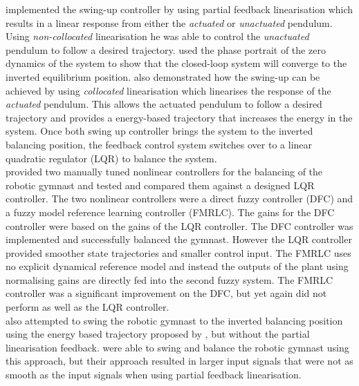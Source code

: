 \citet{spong_swingup} implemented the swing-up controller by using partial feedback linearisation which results in a linear response from either the \textit{actuated} or \textit{unactuated} pendulum. Using \textit{non-collocated} linearisation he was able to control the \textit{unactuated} pendulum to follow a desired trajectory. \citeauthor{spong_swingup} used the phase portrait of the zero dynamics of the system to show that the closed-loop system will converge to the inverted equilibrium position. \citeauthor{spong_swingup} also demonstrated how the swing-up can be achieved by using \textit{collocated} linearisation which linearises the response of the \textit{actuated} pendulum. This allows the actuated pendulum to follow a desired trajectory and \citeauthor{spong_swingup} provides a energy-based trajectory that increases the energy in the system. Once both swing up controller brings the system to the inverted balancing position, the feedback control system switches over to a linear quadratic regulator (LQR) to balance the system.\\

\citet{Brown1997} provided two manually tuned nonlinear controllers for the balancing of the robotic gymnast and tested and compared them against a designed LQR controller. The two nonlinear controllers were a direct fuzzy controller (DFC) and a fuzzy model reference learning controller (FMRLC). The gains for the DFC controller were based on the gains of the LQR controller. The DFC controller was implemented and successfully balanced the gymnast. However the LQR controller provided smoother state trajectories and smaller control input. The FMRLC uses no explicit dynamical reference model and instead the outputs of the plant using normalising gains are directly fed into the second fuzzy system. The FMRLC controller was a significant improvement on the DFC, but yet again did not perform as well as the LQR controller.\\


\citeauthor{Brown1997} also attempted to swing the robotic gymnast to the inverted balancing position using the energy based trajectory proposed by \citeauthor{spong_swingup}, but without the partial linearisation feedback. \citeauthor{Brown1997} were able to swing and balance the robotic gymnast using this approach, but their approach resulted in larger input signals that were not as smooth as the input signals when using partial feedback linearisation.\\



